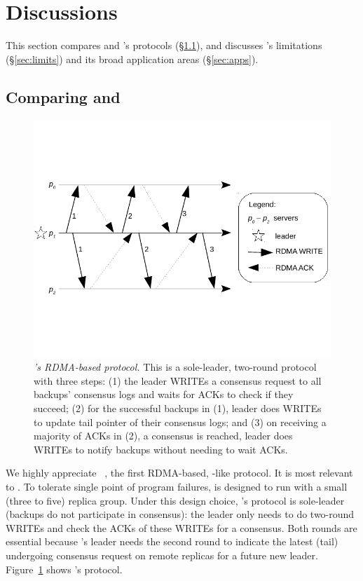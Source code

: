 \section{Discussions}\label{sec:discuss}
% 
This section compares \xxx and \dare's protocols (\S\ref{sec:compare}), and 
discusses \xxx's limitations (\S\ref{sec:limits}) and its broad application 
areas (\S\ref{sec:apps}).

\subsection{Comparing \xxx and \dare}\label{sec:compare}

\begin{figure}[t]
\centering
\vspace{-.5in}
\includegraphics[width=.35\textwidth]{figures/dare_algo}
\vspace{-.6in}
\caption{{\em \dare's RDMA-based protocol.} This is a sole-leader, 
two-round protocol with three steps: (1) the leader WRITEs a consensus request 
to all backups' consensus logs and waits for ACKs to check if they succeed; 
(2) for the successful backups in (1), leader does WRITEs to update tail 
pointer of their consensus logs; and (3) on receiving a majority of ACKs in (2), 
a consensus is reached, leader does WRITEs to notify backups without needing to 
wait ACKs.}
\label{fig:dare}
\vspace{-.20in}
\end{figure}

We highly appreciate \dare~\cite{dare:hpdc15}, the first RDMA-based, 
\paxos-like protocol. It is most relevant to \xxx. To tolerate single point of 
program failures, \dare is designed to run with a small (three to five) replica 
group. Under this design choice, \dare's protocol is sole-leader (backups do 
not participate in consensus): the leader only needs to do two-round WRITEs and 
check the ACKs of these WRITEs for a consensus. Both rounds are essential 
because \dare's leader needs the second round to indicate the latest (tail) 
undergoing consensus request on remote replicas for a future new leader. 
Figure~\ref{fig:dare} shows \dare's protocol.

